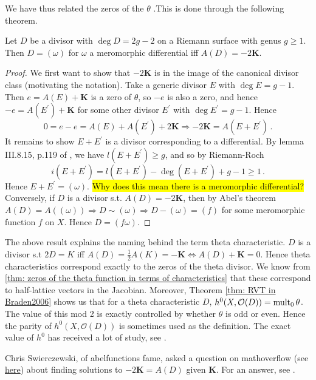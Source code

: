 \documentclass{article}
\begin{document}
We have thus related the zeros of the $\theta$ .This is done through the following theorem.
\begin{theorem}
	Let $D$ be a divisor with $\deg D = 2g-2$ on a Riemann surface with genus $g \geq 1$. Then $D = (\omega)$ for $\omega$ a meromorphic differential iff $A(D) = -2\bm{K}$. 
\end{theorem}
\begin{proof}
	We first want to show that $-2\bm{K}$ is in the image of the canonical divisor class (motivating the notation). Take a generic divisor $E$ with $\deg E = g-1$. Then $e = A(E) + \bm{K}$ is a zero of $\theta$, so $-e$ is also a zero, and hence $-e = A(E^\prime) + \bm{K}$ for some other divisor $E^\prime$ with $\deg E^\prime = g-1$. Hence 
	\[
	0 = e-e = A(E)+A(E^\prime)+2\bm{K} \Rightarrow -2\bm{K} = A(E+E^\prime) \, .
	\]
	It remains to show $E+E^\prime$ is a divisor corresponding to a differential. By lemma III.8.15, p.119 of \cite{Farkas1992}, we have $l(E+E^\prime) \geq g$, and so by Riemann-Roch
	\[
	i(E+E^\prime) = l(E+E^\prime) - \deg(E+E^\prime) +g-1 \geq 1 \, .
	\]
	Hence $E+E^\prime = (\omega)$. \hl{Why does this mean there is a meromorphic differential?} \\
	Conversely, if $D$ is a divisor s.t. $A(D) = -2\bm{K}$, then by Abel's theorem $A(D) = A((\omega)) \Rightarrow D \sim (\omega) \Rightarrow D-(\omega) = (f)$ for some meromorphic function $f$ on $X$. Hence $D = (f\omega)$. 
\end{proof}
\begin{remark}
	The above result explains the naming behind the term theta characteristic. $D$ is a divisor s.t $2D = K$ iff $A(D) = \frac{1}{2}A(K) = -\bm{K} \Leftrightarrow A(D)+ \bm{K}=0$. Hence theta characteristics correspond exactly to the zeros of the theta divisor. We know from \ref{thm: zeros of the theta function in terms of characteristics} that these correspond to half-lattice vectors in the Jacobian. Moreover, Theorem \ref{thm: RVT in Braden2006} shows us that for a theta characteristic $D$, $h^0(X, \mathcal{O}(D)) = \operatorname{mult}_0 \theta$. The value of this mod 2 is exactly controlled by whether $\theta$ is odd or even. Hence the parity of $h^0(X, \mathcal{O}(D))$ is sometimes used as the definition. The exact value of $h^0$ has received a lot of study, see \cite{Bigas1987}. 
\end{remark}
\begin{remark}
	Chris Swierczewski, of abelfunctions fame, asked a question on mathoverflow (see \href{https://mathoverflow.net/questions/212505/uniqueness-of-riemann-constant-vector-solution}{here}) about finding solutions to $-2\bm{K} = A(D)$ given $\bm{K}$. For an answer, see \cite{Braden2012}. 
\end{remark}
\end{document}
